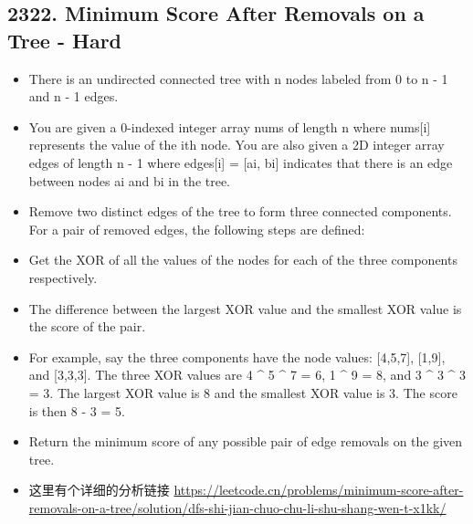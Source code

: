 \documentclass[9pt, b5paaper]{book}
\begin{document}
\subsection{2322. Minimum Score After Removals on a Tree - Hard}
\label{sec-1-11-1}
\begin{itemize}
\item There is an undirected connected tree with n nodes labeled from 0 to n - 1 and n - 1 edges.
\item You are given a 0-indexed integer array nums of length n where nums[i] represents the value of the ith node. You are also given a 2D integer array edges of length n - 1 where edges[i] = [ai, bi] indicates that there is an edge between nodes ai and bi in the tree.
\item Remove two distinct edges of the tree to form three connected components. For a pair of removed edges, the following steps are defined:
\item Get the XOR of all the values of the nodes for each of the three components respectively.
\item The difference between the largest XOR value and the smallest XOR value is the score of the pair.
\item For example, say the three components have the node values: [4,5,7], [1,9], and [3,3,3]. The three XOR values are 4 \^{} 5 \^{} 7 = 6, 1 \^{} 9 = 8, and 3 \^{} 3 \^{} 3 = 3. The largest XOR value is 8 and the smallest XOR value is 3. The score is then 8 - 3 = 5.
\item Return the minimum score of any possible pair of edge removals on the given tree.
\item 这里有个详细的分析链接 \url{https://leetcode.cn/problems/minimum-score-after-removals-on-a-tree/solution/dfs-shi-jian-chuo-chu-li-shu-shang-wen-t-x1kk/}
\end{itemize}
\end{document}
